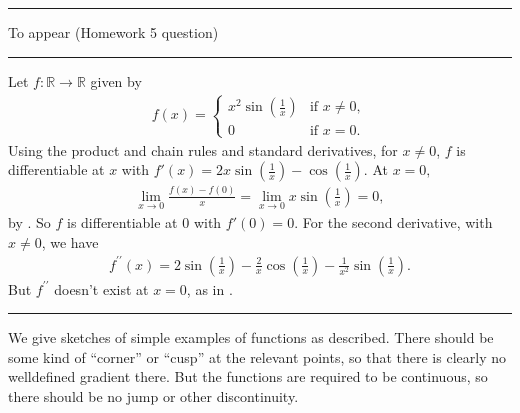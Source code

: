 \documentclass[letterpaper,10pt,english]{jupyterBook}
\begin{document}
\bigskip\hrule\bigskip


\sphinxAtStartPar
{\hyperref[\detokenize{Problems:id41}]{}} To appear (Homework 5 question)


\bigskip\hrule\bigskip


\sphinxAtStartPar
{\hyperref[\detokenize{Problems:id42}]{}} Let  \(f:\mathbb{R}\to \mathbb{R}\) given by
\begin{equation*}
\begin{split}
f(x) = \begin{cases} x^2\sin\left(\frac{1}{x}\right) & \text{if }x \neq 0,\\ 0 & \text{if }x = 0.\end{cases}
\end{split}
\end{equation*}
\sphinxAtStartPar
Using the product and chain rules and standard derivatives, for \(x \neq 0\), \(f\) is differentiable at \(x\) with \(f'(x) = 2x\sin\left(\frac{1}{x}\right) - \cos\left(\frac{1}{x}\right)\). At \(x = 0,\)
\begin{equation*}
\begin{split}
\lim_{x \rightarrow 0}\frac{f(x) - f(0)}{x} = \lim_{x \rightarrow 0}x\sin\left(\frac{1}{x}\right) = 0,
\end{split}
\end{equation*}
\sphinxAtStartPar
by {\hyperref[\detokenize{Problems:id10}]{}}. So \(f\) is differentiable at \(0\) with \(f'(0) = 0\). For the second derivative, with \(x \neq 0\), we have
\begin{equation*}
\begin{split}
f^{\prime \prime}(x) = 2\sin\left(\frac{1}{x}\right) - \frac{2}{x}\cos\left(\frac{1}{x}\right) - \frac{1}{x^{2}}\sin\left(\frac{1}{x}\right).
\end{split}
\end{equation*}
\sphinxAtStartPar
But \(f^{\prime \prime}\) doesn’t exist at \(x = 0\), as in {\hyperref[\detokenize{Problems:id41}]{}}.


\bigskip\hrule\bigskip


\sphinxAtStartPar
{\hyperref[\detokenize{Problems:id43}]{}} We give sketches of simple examples of functions as described. There should be some kind of “corner” or “cusp” at the relevant points, so that there is clearly no well\sphinxhyphen{}defined gradient there. But the functions are required to be continuous, so there should be no jump or other discontinuity.
\end{document}
